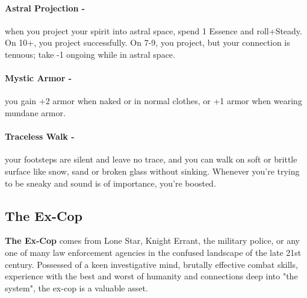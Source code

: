 \paragraph{Astral Projection -} when you project your spirit into astral space, spend 1 Essence and roll+Steady. On 10+, you project successfully. On 7-9, you project, but your connection is tenuous; take -1 ongoing while in astral space.

\paragraph{Mystic Armor -} you gain +2 armor when naked or in normal clothes, or +1 armor when wearing mundane armor.

\paragraph{Traceless Walk -} your footsteps are silent and leave no trace, and you can walk on soft or brittle surface like snow, sand or broken glass without sinking. Whenever you’re trying to be sneaky and sound is of importance, you’re boosted.



\clearpage
\subsection{The Ex-Cop}
\textbf{The Ex-Cop} comes from Lone Star, Knight Errant, the military police, or any one of many law enforcement agencies in the confused landscape of the late 21st century. Possessed of a keen investigative mind, brutally effective combat skills, experience with the best and worst of humanity and connections deep into "the system", the ex-cop is a valuable asset.

